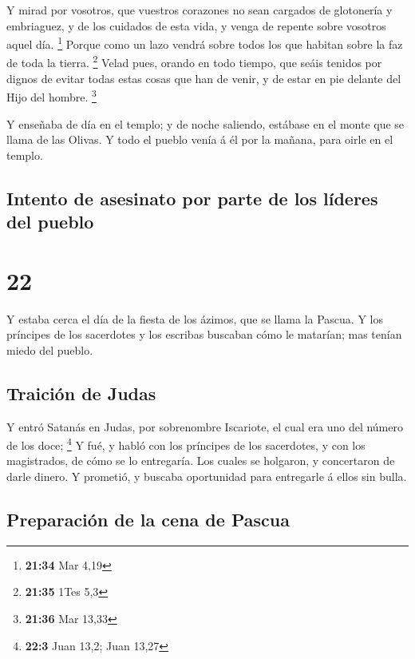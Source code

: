  Y mirad por vosotros, que vuestros corazones no sean
cargados de glotonería y embriaguez, y de los cuidados de esta vida, y
venga de repente sobre vosotros aquel día. \footnote{\textbf{21:34} Mar
  4,19}  Porque como un lazo vendrá sobre todos los que
habitan sobre la faz de toda la tierra. \footnote{\textbf{21:35} 1Tes
  5,3}  Velad pues, orando en todo tiempo, que seáis
tenidos por dignos de evitar todas estas cosas que han de venir, y de
estar en pie delante del Hijo del hombre. \footnote{\textbf{21:36} Mar
  13,33}

 Y enseñaba de día en el templo; y de noche saliendo,
estábase en el monte que se llama de las Olivas.  Y todo
el pueblo venía á él por la mañana, para oirle en el templo.

\hypertarget{intento-de-asesinato-por-parte-de-los-luxedderes-del-pueblo}{%
\subsection{Intento de asesinato por parte de los líderes del
pueblo}\label{intento-de-asesinato-por-parte-de-los-luxedderes-del-pueblo}}

\hypertarget{section-21}{%
\section{22}\label{section-21}}

 Y estaba cerca el día de la fiesta de los ázimos, que se
llama la Pascua.  Y los príncipes de los sacerdotes y los
escribas buscaban cómo le matarían; mas tenían miedo del pueblo.

\hypertarget{traiciuxf3n-de-judas}{%
\subsection{Traición de Judas}\label{traiciuxf3n-de-judas}}

 Y entró Satanás en Judas, por sobrenombre Iscariote, el
cual era uno del número de los doce; \footnote{\textbf{22:3} Juan 13,2;
  Juan 13,27}  Y fué, y habló con los príncipes de los
sacerdotes, y con los magistrados, de cómo se lo entregaría.
 Los cuales se holgaron, y concertaron de darle dinero.
 Y prometió, y buscaba oportunidad para entregarle á ellos
sin bulla.

\hypertarget{preparaciuxf3n-de-la-cena-de-pascua}{%
\subsection{Preparación de la cena de
Pascua}\label{preparaciuxf3n-de-la-cena-de-pascua}}

